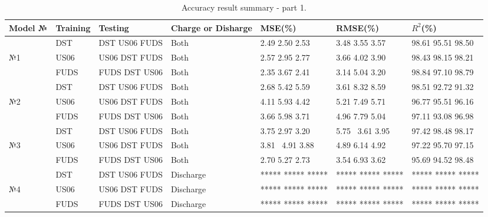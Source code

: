%
\begin{center}
    \begin{table}[htbp]
\begin{tabular}{ p{1.5cm} p{1.5cm} p{1.5cm} p{3.2cm} p{1.5cm} p{1.5cm} p{1.8cm} }
    \hline
    Model № & Training  & Testing & Charge or Disharge & MSE(\%) & RMSE(\%) & $R^{2}$(\%) \\
    \hline
     & DST  & DST US06 FUDS & Both & 2.49 2.50 2.53 & 3.48 3.55 3.57 & 98.61 95.51 98.50 \\
    №1%
     & US06 & US06 DST FUDS & Both & 2.57 2.95 2.77 & 3.66 4.02 3.90 & 98.43 98.15 98.21 \\
     & FUDS & FUDS DST US06 & Both & 2.35 3.67 2.41 & 3.14 5.04 3.20 & 98.84 97.10 98.79 \\
    \hline
     & DST  & DST US06 FUDS & Both & 2.68 5.42 5.59 & 3.61 8.32 8.59 & 98.51 92.72 91.32 \\
    №2%
     & US06 & US06 DST FUDS & Both & 4.11 5.93 4.42 & 5.21 7.49 5.71 & 96.77 95.51 96.16 \\
     & FUDS & FUDS DST US06 & Both & 3.66 5.98 3.71 & 4.96 7.79 5.04 & 97.11 93.08 96.98 \\ %
    \hline
     & DST  & DST US06 FUDS & Both & 3.75 2.97 3.20 & 5.75 \ 3.61 3.95 & 97.42 98.48 98.17 \\
    №3%
     & US06 & US06 DST FUDS & Both & 3.81 \ 4.91 3.88 & 4.89 6.14 4.92 & 97.22 95.70 97.15 \\
     & FUDS & FUDS DST US06 & Both & 2.70 5.27 2.73 & 3.54 6.93 3.62 & 95.69 94.52 98.48 \\ %
    \hline
     & DST  & DST US06 FUDS & Discharge & ***** ***** ***** & ***** ***** ***** & ***** ***** ***** \\
    №4%
     & US06 & US06 DST FUDS & Discharge & ***** ***** ***** & ***** ***** ***** & ***** ***** ***** \\
     & FUDS & FUDS DST US06 & Discharge & ***** ***** ***** & ***** ***** ***** & ***** ***** ***** \\
    \hline
\end{tabular} \\
\caption{Accuracy result summary - part 1.}
\label{tab:acc-results1}
    \end{table}
\end{center}

